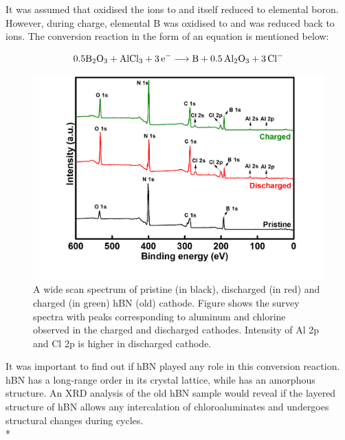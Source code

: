 It was assumed that  oxidised the  ions to  and itself reduced to elemental boron. However, during charge, elemental B was oxidised to  and  was reduced back to  ions. The conversion reaction in the form of an equation is mentioned below: 

\begin{equation}
    0.5\ce{B2O3 + AlCl3 + 3e-} \longrightarrow \ce{B + 0.5Al2O3 + 3Cl-}
\end{equation}

\begin{figure}[tbh!]
\centering
\includegraphics[width=\textwidth]{Figures/BOhBN/hBNXPS}
\caption{A wide scan spectrum of pristine (in black), discharged (in red) and charged (in green) hBN (old) cathode. Figure shows the survey spectra with peaks corresponding to aluminum and chlorine observed in the charged and discharged cathodes. Intensity of Al 2p and Cl 2p is higher in discharged cathode.}
\label{Figures/BOhBN:hBNXPS}
\end{figure}

It was important to find out if hBN played any role in this conversion reaction. hBN has a long-range order in its crystal lattice, while  has an amorphous structure. An XRD analysis of the old hBN sample would reveal if the layered structure of hBN allows any intercalation of chloroaluminates and undergoes structural changes during cycles. \\*


